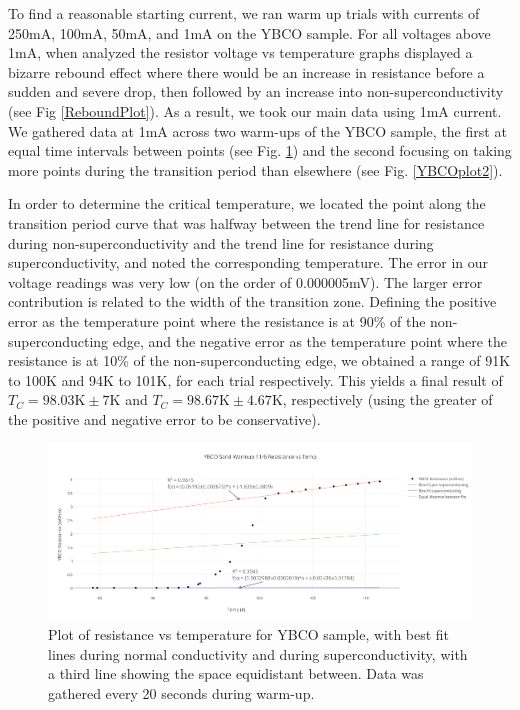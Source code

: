 \documentclass[prb,preprint]{revtex4-1}
\begin{document}
To find a reasonable starting current, we ran warm up trials with currents of 250mA, 100mA, 50mA, and 1mA on the YBCO sample. For all voltages above 1mA, when analyzed the resistor voltage vs temperature graphs displayed a bizarre rebound effect where there would be an increase in resistance before a sudden and severe drop, then followed by an increase into non-superconductivity (see Fig \ref{ReboundPlot}). As a result, we took our main data using 1mA current. We gathered data at 1mA across two warm-ups of the YBCO sample, the first at equal time intervals between points (see Fig. \ref{YBCOplot1}) and the second focusing on taking more points during the transition period than elsewhere (see Fig. \ref{YBCOplot2}).

In order to determine the critical temperature, we located the point along the transition period curve that was halfway between the trend line for resistance during non-superconductivity and the trend line for resistance during superconductivity, and noted the corresponding temperature. The error in our voltage readings was very low (on the order of 0.000005mV). The larger error contribution is related to the width of the transition zone. Defining the positive error as the temperature point where the resistance is at 90\% of the non-superconducting edge, and the negative error as the temperature point where the resistance is at 10\% of the non-superconducting edge, we obtained a range of  91K to 100K and 94K to 101K, for each trial respectively. This yields a final result of $T_{C}=98.03\textrm{K}\pm7\textrm{K}$ and $T_{C}=98.67\textrm{K}\pm4.67\textrm{K}$, respectively (using the greater of the positive and negative error to be conservative).
 
\begin{figure}[h!]
\centering
\includegraphics[width=7in]{ybco_sand_warmup_116_resistance_vs_temp.png}
\caption{Plot of resistance vs temperature for YBCO sample, with best fit lines during normal conductivity and during superconductivity, with a third line showing the space equidistant between. Data was gathered every 20 seconds during warm-up.}
\label{YBCOplot1}
\end{figure}
\end{document}
